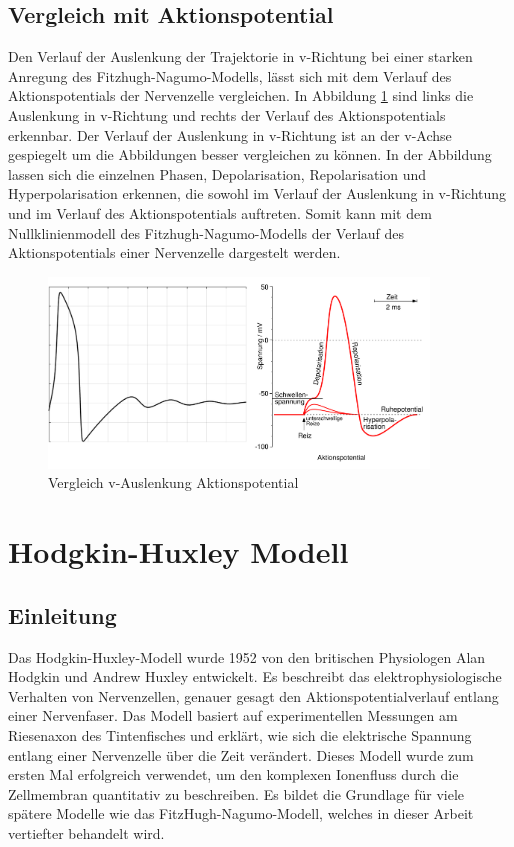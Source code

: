 \begin{refsection}
\subsection{Vergleich mit Aktionspotential}
Den Verlauf der Auslenkung der Trajektorie in v-Richtung bei einer starken Anregung des Fitzhugh-Nagumo-Modells, lässt
sich mit dem Verlauf des Aktionspotentials der Nervenzelle vergleichen. 
In Abbildung \ref{fig:Vergleich} sind links die Auslenkung in v-Richtung und rechts der Verlauf des Aktionspotentials
erkennbar.
Der Verlauf der Auslenkung in v-Richtung ist an der v-Achse gespiegelt um die Abbildungen besser vergleichen zu können.
In der Abbildung lassen sich die einzelnen Phasen, Depolarisation, Repolarisation und Hyperpolarisation erkennen, die
sowohl im Verlauf der Auslenkung in v-Richtung und im Verlauf des Aktionspotentials auftreten.
Somit kann mit dem Nullklinienmodell des Fitzhugh-Nagumo-Modells der Verlauf des Aktionspotentials einer Nervenzelle
dargestelt werden.
\begin{figure}[H]
    \centering
    \includegraphics[width=0.9\textwidth]{papers/nerven/Bilder/Vergleich.png}
    \caption{Vergleich v-Auslenkung Aktionspotential}
    \label{fig:Vergleich}
\end{figure}
\section{Hodgkin-Huxley Modell}
\subsection{Einleitung}
Das Hodgkin-Huxley-Modell wurde 1952 von den britischen Physiologen Alan Hodgkin und Andrew Huxley entwickelt. Es beschreibt das elektrophysiologische Verhalten von Nervenzellen, genauer gesagt den Aktionspotentialverlauf entlang einer Nervenfaser. Das Modell basiert auf experimentellen Messungen am Riesenaxon des Tintenfisches und erklärt, wie sich die elektrische Spannung entlang einer Nervenzelle über die Zeit verändert. Dieses Modell wurde zum ersten Mal erfolgreich verwendet, um den komplexen Ionenfluss durch die Zellmembran quantitativ zu beschreiben. Es bildet die Grundlage für viele spätere Modelle wie das FitzHugh-Nagumo-Modell, welches in dieser Arbeit vertiefter behandelt wird.

\end{refsection}
